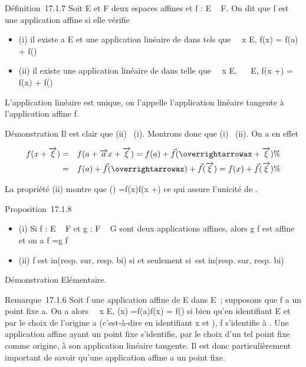 \documentclass[]{article}
\begin{document}
Définition~17.1.7 Soit E et F deux espaces affines et f : E \rightarrow~ F. On dit
que f est une application affine si elle vérifie

\begin{itemize}
\itemsep1pt\parskip0pt
\item
  (i) il existe a \in E et une application linéaire
  \vecf de \overrightarrowE dans
  \overrightarrowF tels que
  \forall~~x \in E, f(x) = f(a) +\vec
  f(\overrightarrowax)
\item
  (ii) il existe une application linéaire \vecf de
  \overrightarrowE dans
  \overrightarrowF telle que
  \forall~~x \in E,
  \forall~\overrightarrow\xi~
  \in\overrightarrow E, f(x
  +\overrightarrow \xi) = f(x) +\vec
  f(\overrightarrow\xi)
\end{itemize}

L'application linéaire \vecf est unique, on l'appelle
l'application linéaire tangente à l'application affine f.

Démonstration Il est clair que (ii) \rigtharrow~(i). Montrons donc que (i) \rigtharrow~(ii).
On a en effet

\begin{align*} f(x +\overrightarrow
\xi)& =& f(a +\overrightarrow ax
+\overrightarrow \xi) = f(a) +\vec
f(\overrightarrowax
+\overrightarrow \xi) \%&
\\ & =& f(a) +\vec
f(\overrightarrowax) +\vec
f(\overrightarrow\xi) = f(x) +\vec
f(\overrightarrow\xi)\%&
\\ \end{align*}

La propriété (ii) montre que
\vecf(\overrightarrow\xi)
=\overrightarrow f(x)f(x
+\overrightarrow \xi) ce qui assure l'unicité de
\vecf.

Proposition~17.1.8

\begin{itemize}
\itemsep1pt\parskip0pt
\item
  (i) Si f : E \rightarrow~ F et g : F \rightarrow~ G sont deux applications affines, alors g
  \cdot f est affine et on a \overrightarrowg \cdot f
  =\vec g \cdot\vec f
\item
  (ii) f est in\jmathective (resp. sur\jmathective, resp. bi\jmathective) si et
  seulement si~\vecf est in\jmathective (resp. sur\jmathective,
  resp. bi\jmathective)
\end{itemize}

Démonstration Elémentaire.

Remarque~17.1.6 Soit f une application affine de E dans E~; supposons
que f a un point fixe a. On a alors \forall~~x \in E,
\overrightarrowaf(x)
=\overrightarrow f(a)f(x) =\vec
f(\overrightarrowax) si bien qu'en identifiant E et
\overrightarrowE par le choix de l'origine a
(c'est-à-dire en identifiant x et \overrightarrowax),
f s'identifie à \vecf. Une application affine ayant
un point fixe s'identifie, par le choix d'un tel point fixe comme
origine, à son application linéaire tangente. Il est donc
particulièrement important de savoir qu'une application affine a un
point fixe.
\end{document}
